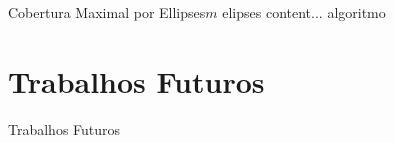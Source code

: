 \documentclass{beamer}
\begin{document}
\begin{frame}{Cobertura Maximal por Ellipses}{$m$ elipses}
	content... algoritmo
\end{frame}

\section{Trabalhos Futuros}

\begin{frame}{Trabalhos Futuros}

\end{frame}
\end{document}
